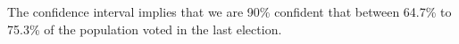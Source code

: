 \documentclass{./../../Latex/tests}
\begin{document}
\begin{enumerate}
The confidence interval implies that we are 90\% confident that between 64.7\% to 75.3\% of the population voted in the last election.
\end{enumerate}
\end{document}
